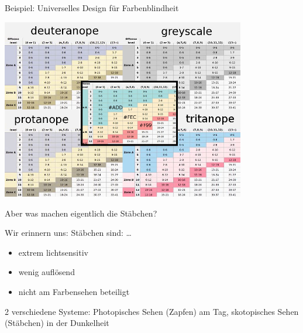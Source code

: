\documentclass{beamer}
\begin{document}
\begin{frame}{Beispiel: Universelles Design für Farbenblindheit}

\begin{center}
    \includegraphics[width=0.8\textwidth]{Safe_Chart_Colors-F99-FEC-ADD.jpg}
\end{center}
    
\end{frame}



\begin{frame}{Aber was machen eigentlich die Stäbchen?}

Wir erinnern uns: Stäbchen sind: \dots

\pause

\begin{itemize}
    \item 
    extrem lichtsensitiv
    \item
    wenig auflösend
    \item
    nicht am Farbensehen beteiligt
\end{itemize}

\pause

2 verschiedene Systeme: Photopisches Sehen (Zapfen) am Tag, skotopisches Sehen (Stäbchen) in der Dunkelheit
    
\end{frame}
\end{document}
